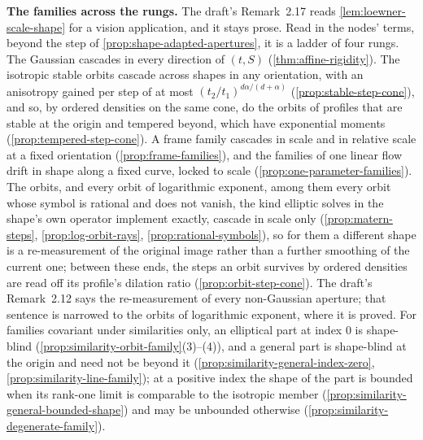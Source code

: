 \textbf{The families across the rungs.} The draft's Remark~2.17 reads \ref{lem:loewner-scale-shape}
for a vision application, and it stays prose. Read in the nodes' terms, beyond the step of
\ref{prop:shape-adapted-apertures}, it is a ladder of four rungs. The Gaussian cascades in every
direction of $(t,S)$ (\ref{thm:affine-rigidity}). The isotropic stable orbits cascade across shapes
in any orientation, with an anisotropy gained per step of at most $(t_2/t_1)^{d\alpha/(d+\alpha)}$
(\ref{prop:stable-step-cone}), and so, by ordered \Levy{} densities on the same cone, do the orbits
of profiles that are stable at the origin and tempered beyond, which have exponential moments
(\ref{prop:tempered-step-cone}). A frame family cascades in scale and in relative scale at a fixed
orientation (\ref{prop:frame-families}), and the families of one linear flow drift in shape along a
fixed curve, locked to scale (\ref{prop:one-parameter-families}). The \Matern{} orbits, and
every orbit of logarithmic exponent, among them every orbit whose symbol is rational and does not
vanish, the kind elliptic solves in the shape's own operator implement exactly, cascade in scale only
(\ref{prop:matern-steps}, \ref{prop:log-orbit-rays}, \ref{prop:rational-symbols}), so for them a different shape is a re-measurement of the original
image rather than a further smoothing of the current one; between these ends, the steps an orbit
survives by ordered \Levy{} densities are read off its profile's dilation ratio
(\ref{prop:orbit-step-cone}). The draft's Remark~2.12 says the re-measurement of every non-Gaussian
aperture; that sentence is narrowed to the orbits of logarithmic exponent, where it is proved. For
families covariant under similarities only, an elliptical part at \Levy{} index $0$ is shape-blind
(\ref{prop:similarity-orbit-family}(3)--(4)), and a general part is shape-blind at the origin and need
not be beyond it (\ref{prop:similarity-general-index-zero}, \ref{prop:similarity-line-family}); at a
positive index the shape of the part is bounded when its rank-one limit is comparable to the isotropic
member (\ref{prop:similarity-general-bounded-shape}) and may be unbounded otherwise
(\ref{prop:similarity-degenerate-family}).
